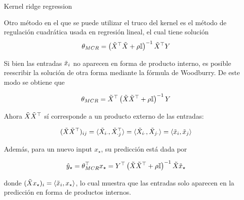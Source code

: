 \documentclass[9pt]{beamer}
\begin{document}
\begin{frame}{Kernel ridge regression}

Otro método en el que se puede utilizar el truco del kernel es el método de regulación cuadrática usada en regresión lineal, el cual tiene solución
\begin{equation*}
    \theta_{MCR} = \left(\tilde{X}^\top\tilde{X} +\rho {\mathbb I}\right)^{-1} \tilde{X}^\top Y
\end{equation*}\pause

Si bien las entradas $\tilde{x}_i$ no aparecen en forma de producto interno, es posible reescribir la solución de otra forma mediante la fórmula de Woodburry. De este modo se obtiene que

\begin{equation*}
	\theta_{MCR} = \tilde{X}^\top\left(\tilde{X}\tilde{X}^\top + \rho{\mathbb I}\right)^{-1}Y
\end{equation*}\pause

Ahora $\tilde{X}\tilde{X}^\top$ sí corresponde a un producto externo de las entradas:

\begin{equation*}
	(\tilde{X}\tilde{X}^\top)_{ij}=\langle\tilde{X}_{i\cdot},\tilde{X}^\top_{\cdot j}\rangle=\langle\tilde{X}_{i\cdot},\tilde{X}_{j\cdot}\rangle = \langle \tilde{x}_i,\tilde{x}_j\rangle
\end{equation*}\pause

Además, para un nuevo input $x_\star$, su predicción está dada por

\begin{equation*}
	\hat{y}_\star = \theta_{MCR}^\top x_\star = Y^\top \left(\tilde{X}\tilde{X}^\top + \rho{\mathbb I}\right)^{-1}\tilde{X} \tilde{x}_\star
\end{equation*}

donde $(\tilde{X} x_\star)_i = \langle \tilde{x}_i,x_\star\rangle$, lo cual muestra que las entradas solo aparecen en la predicción en forma de productos internos.

\end{frame}
\end{document}
